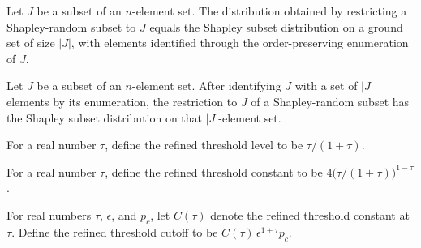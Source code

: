 \begin{theorem}
\label{FABL.shapleySubsetMarginalPMF_eq_shapleySubsetPMFOn}
\leanok
{}
Let $J$ be a subset of an $n$-element set. The distribution obtained by restricting a
Shapley-random subset to $J$ equals the Shapley subset distribution on a ground set of
size $|J|$, with elements identified through the order-preserving enumeration of $J$.
\end{theorem}

\begin{theorem}
\label{FABL.shapleySubsetMarginal_reindex_eq}
\leanok
{}
Let $J$ be a subset of an $n$-element set. After identifying $J$ with a set of $|J|$
elements by its enumeration, the restriction to $J$ of a Shapley-random subset has the
Shapley subset distribution on that $|J|$-element set.
\end{theorem}

\begin{definition}
\label{FABL.refinedThresholdLevel}
\leanok
For a real number $\tau$, define the refined threshold level to be $\tau/(1+\tau)$.
\end{definition}

\begin{definition}
\label{FABL.refinedThresholdConstant}
\leanok
{}
For a real number $\tau$, define the refined threshold constant to be
$4\bigl(\tau/(1+\tau)\bigr)^{1-\tau}$.
\end{definition}

\begin{definition}
\label{FABL.refinedThresholdCutoff}
\leanok
{}
For real numbers $\tau$, $\epsilon$, and $p_c$, let $C(\tau)$ denote the refined
threshold constant at $\tau$. Define the refined threshold cutoff to be
$C(\tau)\,\epsilon^{1+\tau}p_c$.
\end{definition}

